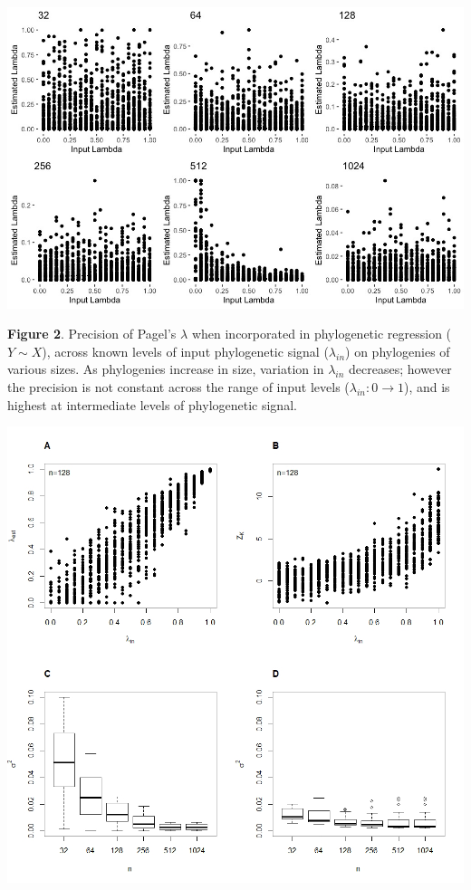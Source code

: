\documentclass[
]{article}
\begin{document}
\newpage

\includegraphics[width=0.95\linewidth]{Fig2}

\singlespacing \textbf{Figure 2}. Precision of Pagel's \(\lambda\) when
incorporated in phylogenetic regression (\(Y\sim X\)), across known
levels of input phylogenetic signal (\(\lambda_{in}\)) on phylogenies of
various sizes. As phylogenies increase in size, variation in
\(\lambda_{in}\) decreases; however the precision is not constant across
the range of input levels (\(\lambda_{in}: 0 \to 1\)), and is highest at
intermediate levels of phylogenetic signal.

\newpage

\includegraphics[width=0.95\linewidth]{Fig3}
\end{document}

